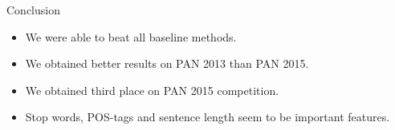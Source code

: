 \documentclass[10pt]{beamer}
\begin{document}
\begin{frame}[fragile]{Conclusion}
    \begin{itemize}
        \item We were able to beat all baseline methods.
        \item We obtained better results on PAN 2013 than PAN 2015.
        \item We obtained third place on PAN 2015 competition.
        \item Stop words, POS-tags and sentence length seem to be important
            features.
    \end{itemize}
\end{frame}
\end{document}
